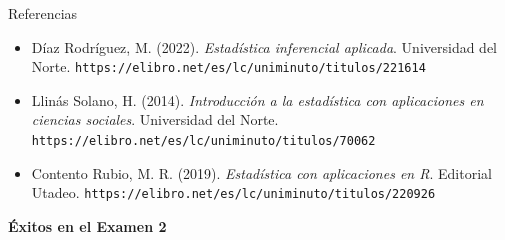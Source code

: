 \documentclass[aspectratio=169,10pt]{beamer}
\begin{document}
\begin{frame}{Referencias}
  \footnotesize
  \begin{itemize}
    \item[{[1]}] Díaz Rodríguez, M. (2022). \textit{Estadística inferencial
      aplicada}. Universidad del Norte.
      \texttt{https://elibro.net/es/lc/uniminuto/titulos/221614}
    \item[{[2]}] Llinás Solano, H. (2014). \textit{Introducción a la
      estadística con aplicaciones en ciencias sociales}. Universidad del
      Norte. \texttt{https://elibro.net/es/lc/uniminuto/titulos/70062}
    \item[{[3]}] Contento Rubio, M. R. (2019). \textit{Estadística con
      aplicaciones en R}. Editorial Utadeo.
      \texttt{https://elibro.net/es/lc/uniminuto/titulos/220926}
  \end{itemize}

  \vspace{0.3cm}
  \begin{center}
    {\Large\color{uniAzul}\textbf{Éxitos en el Examen 2}}
  \end{center}
\end{frame}
\end{document}
